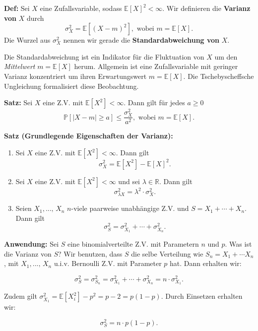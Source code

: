 \documentclass[a4paper]{extarticle}
\begin{document}
\textbf{Def:} Sei $X$ eine Zufallsvariable, sodass $\mathbb{E}[X]^2 < \infty$. Wir definieren die \textbf{Varianz von} $X$ durch
\[
    \sigma_X^2 = \mathbb{E}[(X - m)^2], \text{ wobei } m = \mathbb{E}[X].
\]
Die Wurzel aus $\sigma_X^2$ nennen wir gerade die \textbf{Standardabweichung von} $X$.

Die Standardabweichung ist ein Indikator für die Fluktuation von $X$ um den \textit{Mittelwert} $m = \mathbb{E}[X]$ herum. Allgemein ist eine Zufallsvariable mit geringer Varianz konzentriert um ihren Erwartungswert $m = \mathbb{E}[X]$. Die Tschebyscheffsche Ungleichung formalisiert diese Beobachtung.

\begin{cbox}
    \textbf{Satz:} Sei $X$ eine Z.V. mit $\mathbb{E}[X^2] < \infty$. Dann gilt für jedes $a \geq 0$
    \[
        \mathbb{P}[|X - m| \geq a] \leq \frac{\sigma_X^2}{a^2}, \text{ wobei } m = \mathbb{E}[X].
    \]
\end{cbox}

\begin{cbox}
    \textbf{Satz (Grundlegende Eigenschaften der Varianz):}
    \begin{enumerate}
        \item Sei $X$ eine Z.V. mit $\mathbb{E}[X^2] < \infty$. Dann gilt
        \[\sigma_X^2 = \mathbb{E}[X^2]-\mathbb{E}[X]^2.\]
        \item Sei $X$ eine Z.V. mit $\mathbb{E}[X^2] < \infty$ und sei $\lambda \in \mathbb{R}$. Dann gilt
        \[\sigma^2_{\lambda X} = \lambda^2 \cdot \sigma_X^2.\]
        \item Seien $X_1,..., \, X_n$ $n$-viele paarweise unabhängige Z.V. und $S = X_1 + \cdots + X_n$. Dann gilt
        \[\sigma_S^2 = \sigma_{X_1}^2 + \cdots + \sigma_{X_n}^2.\]
    \end{enumerate}
\end{cbox}

\textbf{Anwendung:} Sei $S$ eine binomialverteilte Z.V. mit Parametern $n$ und $p$. Was ist die Varianz von $S$? Wir benutzen, dass $S$ die selbe Verteilung wie $S_n = X_1 + \cdots X_n$, mit $X_1,..., \, X_n$ u.i.v. Bernoulli Z.V. mit Parameter $p$ hat. Dann erhalten wir:

\[
    \sigma_S^2 = \sigma_{S_n}^2 = \sigma_{X_1}^2 + \cdots + \sigma_{X_n}^2 = n \cdot \sigma_{X_1} ^2.
\]

Zudem gilt $\sigma_{X_1}^2 = \mathbb{E}[X_i^2] - p^2 = p -  2 = p(1-p)$. Durch Einsetzen erhalten wir:

\[
    \sigma_S^2 = n \cdot p(1-p).
\]
\end{document}
